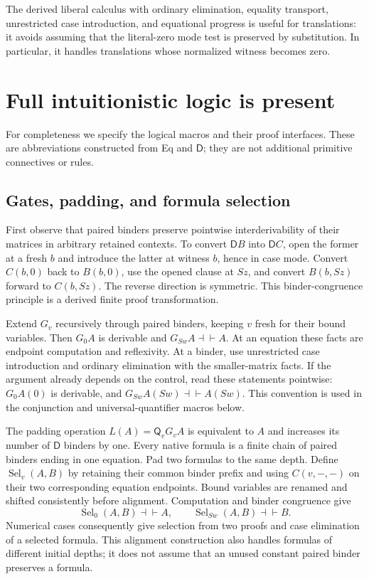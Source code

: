 \documentclass[11pt,letterpaper]{article}
\theoremstyle{definition}\newtheorem{definition}[theorem]{Definition}
\theoremstyle{remark}\newtheorem{remark}[theorem]{Remark}
\newcommand{\DD}{\mathsf D}
\newcommand{\QQ}{\mathsf Q}
\begin{document}
The derived liberal calculus with ordinary elimination, equality
transport, unrestricted case introduction, and equational progress
is useful for translations: it avoids assuming that the literal-zero
mode test is preserved by substitution. In particular, it handles
translations whose normalized witness becomes zero.

\section{Full intuitionistic logic is present}\label{sec:logic}

For completeness we specify the logical macros and their proof
interfaces. These are abbreviations constructed from Eq and $\DD$;
they are not additional primitive connectives or rules.

\subsection{Gates, padding, and formula selection}
First observe that paired binders preserve pointwise interderivability
of their matrices in arbitrary retained contexts. To convert
$\DD B$ into $\DD C$, open the former at a fresh $b$ and introduce
the latter at witness $b$, hence in case mode. Convert $C(b,0)$
back to $B(b,0)$, use the opened clause at $Sz$, and convert
$B(b,Sz)$ forward to $C(b,Sz)$. The reverse direction is symmetric.
This binder-congruence principle is a derived finite proof transformation.

Extend $G_v$ recursively through paired binders, keeping $v$ fresh for
their bound variables. Then $G_0A$ is derivable and
$G_{Sw}A\dashv\vdash A$. At an equation these facts are endpoint
computation and reflexivity. At a binder, use unrestricted case
introduction and ordinary elimination with the smaller-matrix facts.
If the argument already depends on the control, read these statements
pointwise: $G_0A(0)$ is derivable, and
$G_{Sw}A(Sw)\dashv\vdash A(Sw)$. This convention is used in
the conjunction and universal-quantifier macros below.

The padding operation $L(A)=\QQ_vG_vA$ is equivalent to $A$ and
increases its number of $\DD$ binders by one. Every native formula
is a finite chain of paired binders ending in one equation. Pad two
formulas to the same depth. Define $\operatorname{Sel}_v(A,B)$ by
retaining their common binder prefix and using $C(v,-,-)$ on their
two corresponding equation endpoints. Bound variables are renamed
and shifted consistently before alignment. Computation and binder
congruence give
\[
 \operatorname{Sel}_0(A,B)\dashv\vdash A,\qquad
 \operatorname{Sel}_{Sw}(A,B)\dashv\vdash B.
\]
Numerical cases consequently give selection from two proofs and case
elimination of a selected formula. This alignment construction also
handles formulas of different initial depths; it does not assume
that an unused constant paired binder preserves a formula.
\end{document}
